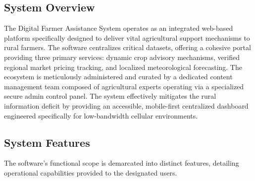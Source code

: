 \subsection{System Overview}
The Digital Farmer Assistance System operates as an integrated web-based platform specifically designed to deliver vital agricultural support mechanisms to rural farmers. The software centralizes critical datasets, offering a cohesive portal providing three primary services: dynamic crop advisory mechanisms, verified regional market pricing tracking, and localized meteorological forecasting. The ecosystem is meticulously administered and curated by a dedicated content management team composed of agricultural experts operating via a specialized secure admin control panel. The system effectively mitigates the rural information deficit by providing an accessible, mobile-first centralized dashboard engineered specifically for low-bandwidth cellular environments.

\subsection{System Features}
The software's functional scope is demarcated into distinct features, detailing operational capabilities provided to the designated users.

